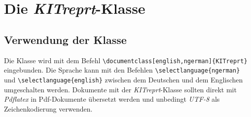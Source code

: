 \documentclass[english,ngerman]{KITreprt}
\begin{document}
\section{Die \emph{KITreprt}-Klasse}
\subsection{Verwendung der Klasse}
Die Klasse wird mit dem Befehl \lstinline[language={[LaTeX]TeX}]!\documentclass[english,ngerman]{KITreprt}! eingebunden.
Die Sprache kann mit den Befehlen \lstinline[language={[LaTeX]TeX},morekeywords={selectlanguage}]!\selectlanguage{ngerman}! und \lstinline[language={[LaTeX]TeX},morekeywords={selectlanguage}]!\selectlanguage{english}! zwischen dem Deutschen und dem Englischen umgeschalten werden.
Dokumente mit der \emph{KITreprt}-Klasse sollten direkt mit \emph{Pdflatex} in Pdf-Dokumente \"ubersetzt werden und unbedingt \emph{UTF-8} als Zeichenkodierung verwenden.


    
\end{document}
